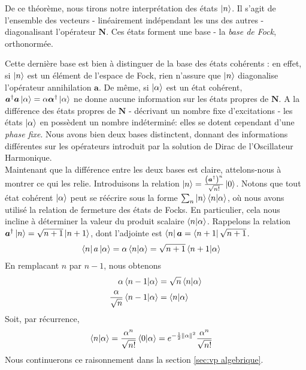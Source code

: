 \documentclass[11pt,oneside,a4paper]{article}
\begin{document}
De ce théorème, nous tirons notre interprétation des états $\ket{n}$. Il s'agit de l'ensemble des vecteurs - linéairement indépendant les uns des autres - diagonalisant l'opérateur $\bm{N}$. Ces états forment une base - la \emph{base de Fock}, orthonormée. 

Cette dernière base est bien à distinguer de la base des états cohérents : en effet, si $\ket{n}$ est un élément de l'espace de Fock, rien n'assure que $\ket{n}$ diagonalise l'opérateur annihilation $\bm{a}$. De même, si $\ket{\alpha}$ est un état cohérent, $\bm{a}^\dagger \bm{a}\ket{\alpha} = \alpha \bm{\alpha}^\dagger\ket{\alpha}$ ne donne aucune information sur les états propres de $\bm{N}$. A la différence des états propres de $\bm{N}$ - décrivant un nombre fixe d'excitations - les états $\ket{\alpha}$ en possèdent un nombre indéterminé: elles se dotent cependant d'une \emph{phase fixe}. Nous avons bien deux bases distinctent, donnant des informations différentes sur les opérateurs introduit par la solution de Dirac de l'Oscillateur Harmonique.\\

Maintenant que la différence entre les deux bases est claire, attelons-nous à montrer ce qui les relie. Introduisons la relation $\ket{n} = \frac{\left(\bm{a}^\dagger\right)^n}{\sqrt{n!}}\ket{0}$. Notons que tout état cohérent $\ket{\alpha}$ peut se réécrire sous la forme $\sum_n \ket{n}\braket{n}{\alpha}$, où nous avons utilisé la relation de fermeture des états de Focks. En particulier, cela nous incline à déterminer la valeur du produit scalaire $\braket{n}{\alpha}$. Rappelons la relation $\bm{a}^\dagger\ket{n} = \sqrt{n+1}\ket{n+1}$, dont l'adjointe est $\bra{n}\bm{a} = \bra{n+1}\sqrt{n+1}$.
\begin{align}
  \bra{n}a\ket{\alpha} = \alpha\braket{n}{\alpha} &= \sqrt{n+1}\braket{n+1}{\alpha}\notag
\end{align}
En remplacant $n$ par $n-1$, nous obtenons
\begin{align}
  \alpha\braket{n-1}{\alpha} &= \sqrt{n}\braket{n}{\alpha}\notag\\
  \frac{\alpha}{\sqrt{n}}\braket{n-1}{\alpha} &= \braket{n}{\alpha}\notag
\end{align}
Soit, par récurrence, 
\begin{align}
  \braket{n}{\alpha} &= \frac{\alpha^n}{\sqrt{n!}}\braket{0}{\alpha} = e^{-\frac{1}{2}\norm{\alpha}^2}\frac{\alpha^n}{\sqrt{n!}}\label{eq:scalar fock vs coherent}
\end{align}
Nous continuerons ce raisonnement dans la section \ref{sec:vp algebrique}.
\end{document}
